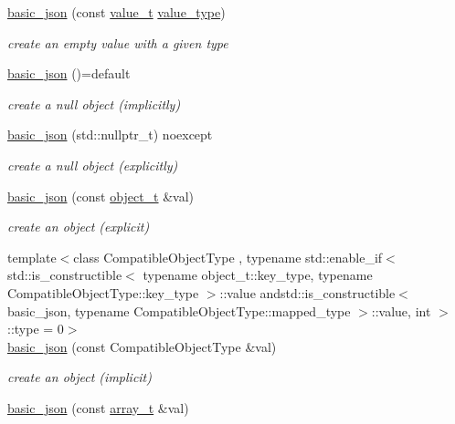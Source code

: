 \begin{DoxyCompactItemize}
\hyperlink{classnlohmann_1_1basic__json_a8f77085bd98c97a983d9ba12efbf6148}{basic\-\_\-json} (const \hyperlink{classnlohmann_1_1basic__json_a231b02148577b69a154b2ce2c87a5522}{value\-\_\-t} \hyperlink{classnlohmann_1_1basic__json_ac8d45b57874b4a6e9c07f7d3b5daa1f9}{value\-\_\-type})
\begin{DoxyCompactList}\small\item\em create an empty value with a given type \end{DoxyCompactList}\item 
\hyperlink{classnlohmann_1_1basic__json_a53771a7a4f2787125e55f64448f24ce6}{basic\-\_\-json} ()=default
\begin{DoxyCompactList}\small\item\em create a null object (implicitly) \end{DoxyCompactList}\item 
\hyperlink{classnlohmann_1_1basic__json_ade0e56c8c320d7f342e7a5697e6d6f7e}{basic\-\_\-json} (std\-::nullptr\-\_\-t) noexcept
\begin{DoxyCompactList}\small\item\em create a null object (explicitly) \end{DoxyCompactList}\item 
\hyperlink{classnlohmann_1_1basic__json_a9af5ea68c88f423ddf35216aff7f1813}{basic\-\_\-json} (const \hyperlink{classnlohmann_1_1basic__json_a0ac9894c9de8dc551cf2e5f1c605537f}{object\-\_\-t} \&val)
\begin{DoxyCompactList}\small\item\em create an object (explicit) \end{DoxyCompactList}\item 
{\footnotesize template$<$class Compatible\-Object\-Type , typename std\-::enable\-\_\-if$<$ std\-::is\-\_\-constructible$<$ typename object\-\_\-t\-::key\-\_\-type, typename Compatible\-Object\-Type\-::key\-\_\-type $>$\-::value andstd\-::is\-\_\-constructible$<$ basic\-\_\-json, typename Compatible\-Object\-Type\-::mapped\-\_\-type $>$\-::value, int $>$\-::type  = 0$>$ }\\\hyperlink{classnlohmann_1_1basic__json_ab7be2bc58ae0c2c2c30d40f15d6399f8}{basic\-\_\-json} (const Compatible\-Object\-Type \&val)
\begin{DoxyCompactList}\small\item\em create an object (implicit) \end{DoxyCompactList}\item 
\hyperlink{classnlohmann_1_1basic__json_a3aaf41d385f0d9a93deb92f9b14ae0cf}{basic\-\_\-json} (const \hyperlink{classnlohmann_1_1basic__json_ab00b882d39306d663c23dab110f5cae0}{array\-\_\-t} \&val)

\end{DoxyCompactItemize}
